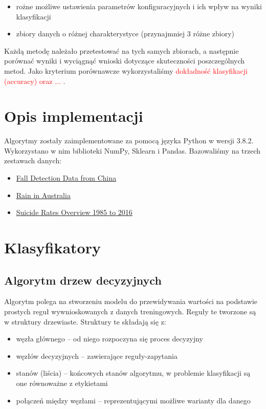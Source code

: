 \documentclass[a4paper,11pt]{article}
\begin{document}
\begin{itemize}
    \item rożne możliwe ustawienia parametrów konfiguracyjnych i ich wpływ na wyniki klasyfikacji
    \item zbiory danych o różnej charakterystyce (przynajmniej 3 różne zbiory)
\end{itemize}

Każdą metodę należało przetestować na tych samych zbiorach, a następnie porównać wyniki i wyciągnąć wnioski dotyczące skuteczności poszczególnych metod. Jako kryterium porównawcze wykorzystaliśmy \textcolor{red}{dokładność klasyfikacji (accuracy) oraz ...} .

\section{Opis implementacji}
Algorytmy zostały zaimplementowane za pomocą języka Python w wersji 3.8.2.
Wykorzystano w nim biblioteki NumPy, Sklearn i Pandas. Bazowaliśmy na trzech zestawach danych: 
\begin{itemize}
    \item{\href{https://www.kaggle.com/pitasr/falldata}{Fall Detection Data from China}}
    \item{\href{https://www.kaggle.com/jsphyg/weather-dataset-rattle-package}{Rain in Australia}}
    \item{\href{https://www.kaggle.com/russellyates88/suicide-rates-overview-1985-to-2016}{Suicide Rates Overview 1985 to 2016}}
\end{itemize}

\section{Klasyfikatory}

\subsection{Algorytm drzew decyzyjnych}
Algorytm polega na stworzeniu modelu do przewidywania wartości na podstawie prostych reguł wywnioskowanych z danych treningowych. Reguły te tworzone są w struktury drzewiaste. Struktury te składają się z:

\begin{itemize}
    \item węzła głównego -- od niego rozpoczyna się proces decyzyjny
    \item węzłów decyzyjnych -- zawierające reguły-zapytania
    \item stanów (liścia) -- końcowych stanów algorytmu, w problemie klasyfikacji są one równoważne z etykietami
    \item połączeń między węzłami -- reprezentującymi możliwe warianty dla danego
\end{itemize}
\end{document}
